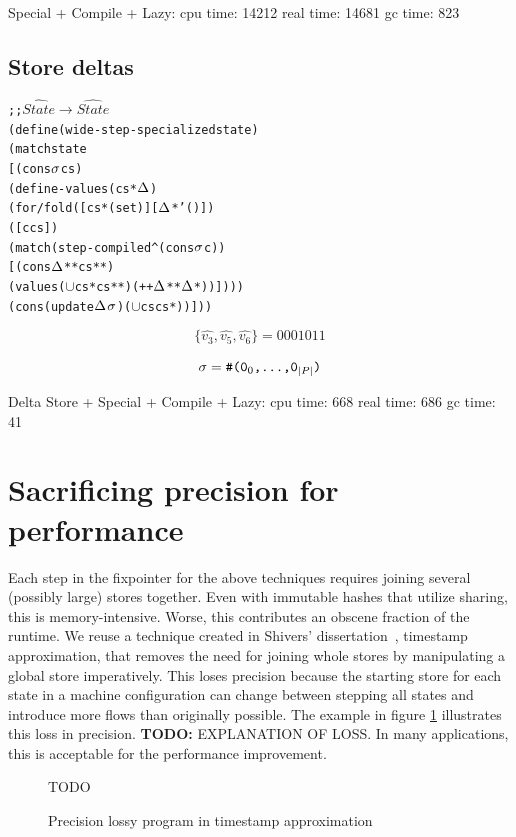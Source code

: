 \documentclass[preprint,onecolumn,9pt]{sigplanconf} %
\begin{document}
Special + Compile + Lazy:
   cpu time: 14212 real time: 14681 gc time: 823

\subsection{Store deltas}

\begin{alltt}
;; \(\widehat{State} \to \widehat{State}\)
(define (wide-step-specialized state)
  (match state
    [(cons \(\msto\) cs)
     (define-values (cs* \(\msdiff\))
       (for/fold ([cs* (set)] [\(\msdiff\)* '()])
         ([c cs])
         (match (step-compiled^ (cons \(\msto\) c))
           [(cons \(\msdiff\)** cs**)
            (values (\(\cup\) cs* cs**) (++ \(\msdiff\)** \(\msdiff\)*))])))
     (cons (update \(\msdiff\) \(\msto\)) (\(\cup\) cs cs*))]))
\end{alltt}

\[
\{ \widehat{v_3}, \widehat{v_5}, \widehat{v_6} \} = 0001011
\]

\[
\sigma = \mbox{\tt \#(0$_0$,\dots,0$_{|P|}$)}
\]

Delta Store + Special + Compile + Lazy:
   cpu time: 668 real time: 686 gc time: 41

\section{Sacrificing precision for performance}

Each step in the fixpointer for the above techniques requires joining
several (possibly large) stores together. Even with immutable hashes
that utilize sharing, this is memory-intensive. Worse, this
contributes an obscene fraction of the runtime. We reuse a technique
created in Shivers' dissertation~\cite{ianjohnson:Shivers:1991:CFA},
timestamp approximation, that removes the need for joining whole
stores by manipulating a global store imperatively. This loses
precision because the starting store for each state in a machine
configuration can change between stepping all states and introduce
more flows than originally possible. The example in figure
\ref{fig:timestamp} illustrates this loss in precision. {\bf TODO:}
EXPLANATION OF LOSS. In many applications, this is acceptable for the
performance improvement.

\begin{figure}
TODO
\caption{Precision lossy program in timestamp approximation}
\label{fig:timestamp}
\end{figure}
\end{document}
